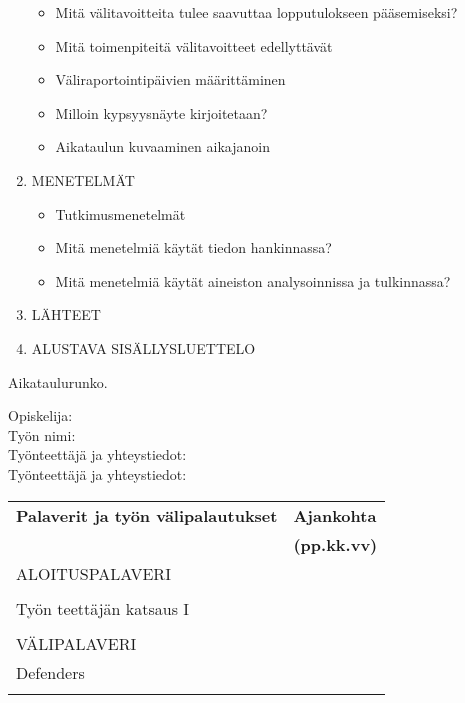 \documentclass{LUT_pohja}[2016/03/09 LUT Dippa Pohja]
\begin{document}
\begin{appendices}
\begin{enumerate}[1.,noitemsep, nolistsep, topsep=-1em]
  \begin{itemize}[ ]
  \item Mitä välitavoitteita tulee saavuttaa lopputulokseen pääsemiseksi? 
  \item Mitä toimenpiteitä välitavoitteet edellyttävät
  \item Väliraportointipäivien määrittäminen
  \item Milloin kypsyysnäyte kirjoitetaan?
  \item Aikataulun kuvaaminen aikajanoin
  \end{itemize}
\item \MakeUppercase{MENETELMÄT}
  \begin{itemize}[ ]
  \item Tutkimusmenetelmät
  \item Mitä menetelmiä käytät tiedon hankinnassa?
  \item Mitä menetelmiä käytät aineiston analysoinnissa ja tulkinnassa?
  \end{itemize}
\item \MakeUppercase{LÄHTEET}
\item \MakeUppercase{ALUSTAVA SISÄLLYSLUETTELO}
\end{enumerate}
\newpage
Aikataulurunko.\par 
Opiskelija:\\
Työn nimi:\\
Työnteettäjä ja yhteystiedot:\\
Työnteettäjä ja yhteystiedot:
\vspace{1em}
\begin{table}[htb]
\begin{tabular}{|p{13cm}|l|}
	\hline
  \textbf{Palaverit ja työn välipalautukset} & \textbf{Ajankohta}\\
    & \textbf{(pp.kk.vv)}\\ \hline
  ALOITUSPALAVERI  & \\
    & \\ \hline %
  Työn teettäjän katsaus I  & \\ \cline{2-2}
     &  \\  \hline 
  VÄLIPALAVERI & \\ 
  \multirow{4}{*}{Defenders} & \\
    &  \\ 
    &  \\
    &  \\
    &  \\
  \hline
\end{tabular}
\end{table}



\end{appendices}
\end{document}
